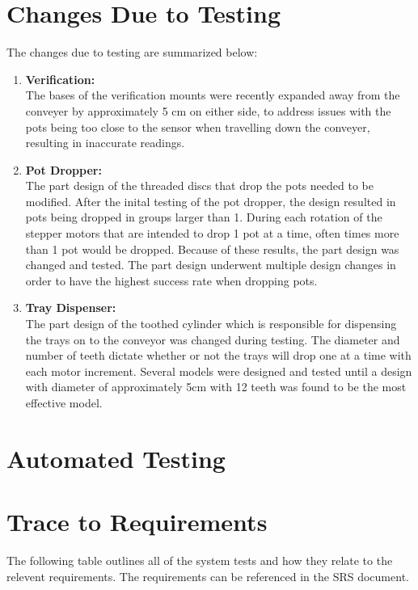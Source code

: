 \documentclass[12pt, titlepage]{article}
\begin{document}
\section{Changes Due to Testing}

The changes due to testing are summarized below:
\\
\begin{enumerate}
  \item \textbf{Verification:}\\
  The bases of the verification mounts were recently expanded away from the
  conveyer by approximately 5 cm on either side, to address issues with the pots being too close to the 
  sensor when travelling down the conveyer, resulting in inaccurate readings.

  \item \textbf{Pot Dropper:}\\
  The part design of the threaded discs that drop the pots needed to be modified.
  After the inital testing of the pot dropper, the design resulted in pots being dropped
  in groups larger than 1. During each rotation of the stepper motors that are intended to drop 1 pot
  at a time, often times more than 1 pot would be dropped. Because of these results, the part design was 
  changed and tested. The part design underwent multiple design changes in order to have the highest success rate 
  when dropping pots.

  \item \textbf{Tray Dispenser:}\\
  The part design of the toothed cylinder which is responsible for dispensing the trays on to the conveyor
  was changed during testing. The diameter and number of teeth dictate whether or not the trays will drop one at a time with 
  each motor increment. Several models were designed and tested until a design with diameter of approximately 5cm with 12 teeth was found to be the 
  most effective model.
\end{enumerate}

\section{Automated Testing}
		
\section{Trace to Requirements}

The following table outlines all of the system tests and how they relate to the
relevent requirements. The requirements can be referenced in the SRS document.\\
\end{document}
